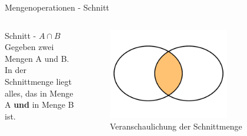 %
%
%
%

\begin{frame}{Mengenoperationen - Schnitt}
\begin{columns}
    \begin{alertblock}{Schnitt - $A\cap B$}
    Gegeben zwei Mengen A und B.\\
    In der Schnittmenge liegt alles, das in Menge A \textbf{und} in Menge B ist.
    \end{alertblock}
\begin{figure}
    \centering
    \includegraphics[width=0.7\textwidth]{../figures/AundB.png}
    \caption{Veranschaulichung der Schnittmenge}
    \label{fig:my_label}
\end{figure}
\end{columns}
\end{frame}

